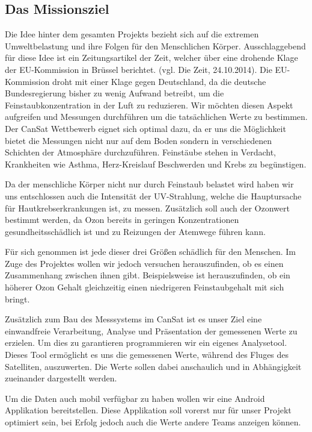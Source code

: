 \subsection{Das Missionsziel}
Die Idee hinter dem gesamten Projekts bezieht sich auf die extremen Umweltbelastung und ihre Folgen für den Menschlichen Körper. Ausschlaggebend für diese Idee ist ein Zeitungsartikel der Zeit, welcher über eine drohende Klage der EU-Kommission in Brüssel berichtet. (vgl. Die Zeit, 24.10.2014). Die EU-Kommission droht mit einer Klage gegen Deutschland, da die deutsche Bundesregierung bisher zu wenig Aufwand betreibt, um die Feinstaubkonzentration in der Luft zu reduzieren. Wir möchten diesen Aspekt aufgreifen und Messungen durchführen um die tatsächlichen Werte zu bestimmen. Der CanSat Wettbewerb eignet sich optimal dazu, da er uns die Möglichkeit bietet die Messungen nicht nur auf dem Boden sondern in verschiedenen Schichten der Atmosphäre durchzuführen. Feinstäube stehen in Verdacht, Krankheiten wie Asthma, Herz-Kreislauf Beschwerden und Krebs zu begünstigen.

Da der menschliche Körper nicht nur durch Feinstaub belastet wird haben wir uns entschlossen auch die Intensität der UV-Strahlung, welche die Hauptursache für Hautkrebserkrankungen ist, zu messen. Zusätzlich soll auch der Ozonwert bestimmt werden, da Ozon bereits in geringen Konzentrationen gesundheitsschädlich ist und zu Reizungen der Atemwege führen kann.

Für sich genommen ist jede dieser drei Größen schädlich für den Menschen. Im Zuge des Projektes wollen wir jedoch versuchen herauszufinden, ob es einen Zusammenhang zwischen ihnen gibt. Beispielsweise ist herauszufinden, ob ein höherer Ozon Gehalt gleichzeitig einen niedrigeren Feinstaubgehalt mit sich bringt.

Zusätzlich zum Bau des Messsystems im CanSat ist es unser Ziel eine einwandfreie Verarbeitung, Analyse und Präsentation der gemessenen Werte zu erzielen. Um dies zu garantieren programmieren wir ein eigenes Analysetool. Dieses Tool ermöglicht es uns die gemessenen Werte, während des Fluges des Satelliten, auszuwerten. Die Werte sollen dabei anschaulich und in Abhängigkeit zueinander dargestellt werden.

Um die Daten auch mobil verfügbar zu haben wollen wir eine Android Applikation bereitstellen. Diese Applikation soll vorerst nur für unser Projekt optimiert sein, bei Erfolg jedoch auch die Werte andere Teams anzeigen können.

